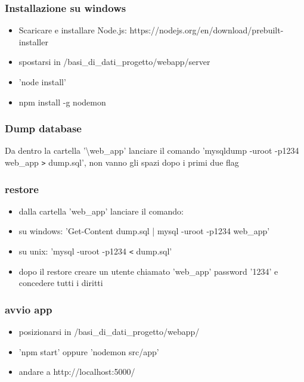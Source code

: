 \subsubsection{Installazione su windows}
\begin{itemize}
\item Scaricare e installare Node.js: https://nodejs.org/en/download/prebuilt-installer
\item spostarsi in /basi{\_}di{\_}dati{\_}progetto/webapp/server
\item 'node install'
\item npm install -g nodemon
\end{itemize}

\subsubsection{Dump database}
Da dentro la cartella '\textbackslash web{\_}app' lanciare il comando 'mysqldump -uroot -p1234  web{\_}app \texttt{>} dump.sql', non vanno gli spazi dopo i primi due flag

\subsubsection{restore}
\begin{itemize}
\item dalla cartella 'web{\_}app' lanciare il comando:
\item su windows: 'Get-Content dump.sql | mysql -uroot -p1234 web{\_}app'
\item su unix: 'mysql -uroot -p1234 \texttt{<} dump.sql'
\item dopo il restore creare un utente chiamato 'web{\_}app' password '1234' e concedere tutti i diritti
\end{itemize}

\subsubsection{avvio app}
\begin{itemize}
\item  posizionarsi in /basi{\_}di{\_}dati{\_}progetto/webapp/
\item  'npm start' oppure 'nodemon src/app'
\item  andare a http://localhost:5000/
\end{itemize}